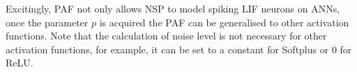 \documentclass{article}
\begin{document}
	Excitingly, PAF not only allows NSP to model spiking LIF neurons on ANNs, once the parameter $p$ is acquired the PAF can be generalised to other activation functions.
	Note that the calculation of noise level is not necessary for other activation functions, for example, it can be set to a constant for Softplus or 0 for ReLU.
	
\end{document}
